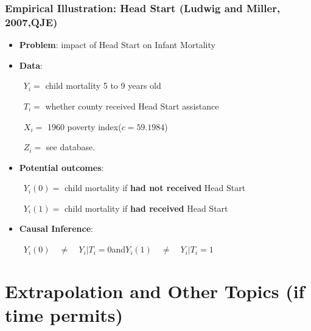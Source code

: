 \documentclass[9pt]{beamer}
\renewcommand{\c}{c}
\begin{document}
\begin{frame}\frametitle{Empirical Illustration: Head Start (Ludwig and Miller, 2007,QJE)}
	\begin{itemize}
		\item \textbf{Problem}: impact of Head Start on Infant Mortality\bigskip
		
		\item \textbf{Data}:\medskip
		
		~\qquad$Y_{i}=$ child mortality 5 to 9 years old\medskip
		
		~\qquad$T_{i}=$ whether county received Head Start assistance\medskip
		
		~\qquad$X_{i}=$ 1960 poverty index\quad($\c=59.1984$)\medskip
		
		~\qquad$Z_{i}=$ see database.\bigskip
		
		\item \textbf{Potential outcomes}:\medskip
		
		~\qquad$Y_{i}(0)=$ child mortality if \textbf{had not received} Head
		Start\medskip
		
		~\qquad$Y_{i}(1)=$ child mortality if \textbf{had received} Head Start\bigskip
		
		\item \textbf{Causal Inference}:\medskip
		
		~\qquad$Y_{i}(0) \quad\neq\quad Y_{i}|T_{i}=0$\qquad\qquad and\qquad\qquad$Y_{i}(1) \quad\neq\quad Y_{i}|T_{i}=1$\bigskip
	\end{itemize}
\end{frame}

\section{Extrapolation and Other Topics (if time permits)}
\end{document}
